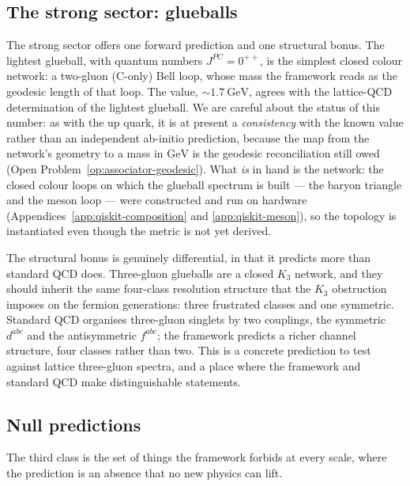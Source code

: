 \subsection{The strong sector: glueballs}

The strong sector offers one forward prediction and one structural bonus. The lightest glueball, with
quantum numbers $J^{PC} = 0^{++}$, is the simplest closed colour network: a two-gluon
($\mathrm{C}$-only) Bell loop, whose mass the framework reads as the geodesic length of that loop.
The value, $\sim 1.7\ \mathrm{GeV}$, agrees with the lattice-QCD determination of the lightest
glueball. We are careful about the status of this number: as with the up quark, it is at present a
\emph{consistency} with the known value rather than an independent ab-initio prediction, because the
map from the network's geometry to a mass in $\mathrm{GeV}$ is the geodesic reconciliation still owed
(Open Problem~\ref{op:associator-geodesic}). What \emph{is} in hand is the network: the closed colour
loops on which the glueball spectrum is built --- the baryon triangle and the meson loop --- were
constructed and run on hardware (Appendices~\ref{app:qiskit-composition} and \ref{app:qiskit-meson}),
so the topology is instantiated even though the metric is not yet derived.

The structural bonus is genuinely differential, in that it predicts more than standard QCD does.
Three-gluon glueballs are a closed $K_3$ network, and they should inherit the same four-class
resolution structure that the $K_3$ obstruction imposes on the fermion generations: three frustrated
classes and one symmetric. Standard QCD organises three-gluon singlets by two couplings, the
symmetric $d^{abc}$ and the antisymmetric $f^{abc}$; the framework predicts a richer channel
structure, four classes rather than two. This is a concrete prediction to test against lattice
three-gluon spectra, and a place where the framework and standard QCD make distinguishable
statements.

\subsection{Null predictions}

The third class is the set of things the framework forbids at every scale, where the prediction is an
absence that no new physics can lift.

